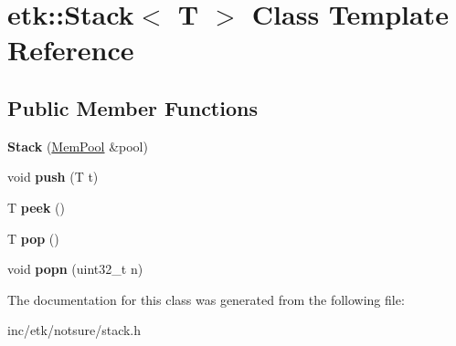 \hypertarget{classetk_1_1_stack}{\section{etk\-:\-:Stack$<$ T $>$ Class Template Reference}
\label{classetk_1_1_stack}
}
\subsection*{Public Member Functions}
\begin{DoxyCompactItemize}
\item 
\hypertarget{classetk_1_1_stack_a2e417dd4a45a50f6bfc847f52e2dc436}{{\bfseries Stack} (\hyperlink{classetk_1_1_mem_pool}{Mem\-Pool} \&pool)}\label{classetk_1_1_stack_a2e417dd4a45a50f6bfc847f52e2dc436}

\item 
\hypertarget{classetk_1_1_stack_a6a5bf48224903dcc5cb3e1590bb86c82}{void {\bfseries push} (T t)}\label{classetk_1_1_stack_a6a5bf48224903dcc5cb3e1590bb86c82}

\item 
\hypertarget{classetk_1_1_stack_a718ff8a7ee9489acb4256a9e0cb27f48}{T {\bfseries peek} ()}\label{classetk_1_1_stack_a718ff8a7ee9489acb4256a9e0cb27f48}

\item 
\hypertarget{classetk_1_1_stack_a7017c030c7fd5c95b8c17731954cb58b}{T {\bfseries pop} ()}\label{classetk_1_1_stack_a7017c030c7fd5c95b8c17731954cb58b}

\item 
\hypertarget{classetk_1_1_stack_a985c47eeb184c8bc22483be943b0c6cd}{void {\bfseries popn} (uint32\-\_\-t n)}\label{classetk_1_1_stack_a985c47eeb184c8bc22483be943b0c6cd}

\end{DoxyCompactItemize}


The documentation for this class was generated from the following file\-:\begin{DoxyCompactItemize}
\item 
inc/etk/notsure/stack.\-h\end{DoxyCompactItemize}
